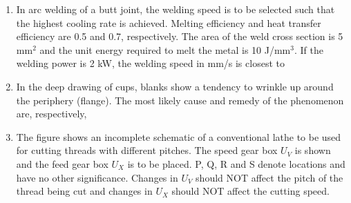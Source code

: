 \documentclass[journal,12pt,onecolumn]{IEEEtran}
\begin{document}
\begin{enumerate}
    \item In arc welding of a butt joint, the welding speed is to be selected such that the highest cooling rate is achieved. Melting efficiency and heat transfer efficiency are 0.5 and 0.7, respectively. The area of the weld cross section is 5 mm$^2$ and the unit energy required to melt the metal is 10 J/mm$^3$. If the welding power is 2 kW, the welding speed in mm/s is closest to\\

          \begin{enumerate}
          \end{enumerate}

    \item In the deep drawing of cups, blanks show a tendency to wrinkle up around the periphery (flange). The most likely cause and remedy of the phenomenon are, respectively,\\

          \begin{enumerate}
          \end{enumerate}

    \item The figure shows an incomplete schematic of a conventional lathe to be used for cutting threads with different pitches. The speed gear box $U_V$ is shown and the feed gear box $U_X$ is to be placed. P, Q, R and S denote locations and have no other significance. Changes in $U_V$ should NOT affect the pitch of the thread being cut and changes in $U_X$ should NOT affect the cutting speed.


\end{enumerate}
\end{document}
